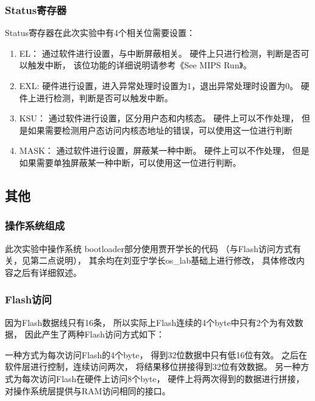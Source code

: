         \subsubsection{Status寄存器}
            Status寄存器在此次实验中有4个相关位需要设置：
            \begin{enumerate}
            \item
                EL：%
                通过软件进行设置，与中断屏蔽相关。%
                硬件上只进行检测，判断是否可以触发中断，%
                该位功能的详细说明请参考《See MIPS Run》。%
            \item
                EXL:%
                硬件进行设置，进入异常处理时设置为1，退出异常处理时设置为0。%
                硬件上进行检测，判断是否可以触发中断。
            \item
                KSU：%
                通过软件进行设置，区分用户态和内核态。%
                硬件上可以不作处理，%
                但是如果需要检测用户态访问内核态地址的错误，可以使用这一位进行判断
            \item
                MASK：%
                通过软件进行设置，屏蔽某一种中断。%
                硬件上可以不作处理，%
                但是如果需要单独屏蔽某一种中断，可以使用这一位进行判断。
            \end{enumerate}


    \subsection{其他}
        \subsubsection{操作系统组成}
            此次实验中操作系统%
            bootloader部分使用贾开学长的代码%
            （与Flash访问方式有关，见第二点说明），%
            其余均在刘亚宁学长os\_lab基础上进行修改，%
            具体修改内容之后有详细叙述。

        \subsubsection{Flash访问}
            因为Flash数据线只有16条，%
            所以实际上Flash连续的4个byte中只有2个为有效数据，%
            因此产生了两种Flash访问方式如下：

            一种方式为每次访问Flash的4个byte，%
            得到32位数据中只有低16位有效。%
            之后在软件层进行控制，连续访问两次，%
            将结果移位拼接得到32位有效数据。%
            另一种方式为每次访问Flash在硬件上访问8个byte，%
            硬件上将两次得到的数据进行拼接，%
            对操作系统层提供与RAM访问相同的接口。

